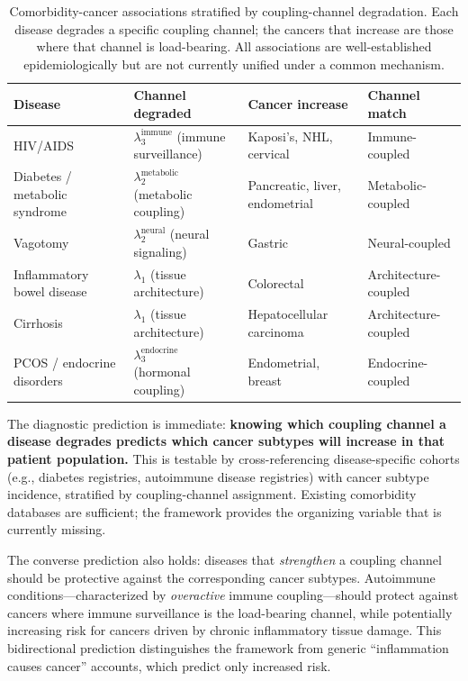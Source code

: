 \documentclass[11pt]{article}
\theoremstyle{definition}
\theoremstyle{remark}
\begin{document}
\begin{table}[ht]
\centering
\small
\caption{Comorbidity-cancer associations stratified by
coupling-channel degradation. Each disease degrades a specific
coupling channel; the cancers that increase are those where that
channel is load-bearing. All associations are well-established
epidemiologically but are not currently unified under a common
mechanism.}
\label{tab:comorbidity}
\begin{tabular}{@{}p{3.0cm}p{3.0cm}p{3.5cm}p{3.0cm}@{}}
\toprule
\textbf{Disease} & \textbf{Channel degraded} &
\textbf{Cancer increase} & \textbf{Channel match} \\
\midrule
HIV/AIDS &
$\lambda_3^{\mathrm{immune}}$ (immune surveillance) &
Kaposi's, NHL, cervical &
Immune-coupled \\[4pt]
Diabetes / metabolic syndrome &
$\lambda_2^{\mathrm{metabolic}}$ (metabolic coupling) &
Pancreatic, liver, endometrial &
Metabolic-coupled \\[4pt]
Vagotomy &
$\lambda_2^{\mathrm{neural}}$ (neural signaling) &
Gastric &
Neural-coupled \\[4pt]
Inflammatory bowel disease &
$\lambda_1$ (tissue architecture) &
Colorectal &
Architecture-coupled \\[4pt]
Cirrhosis &
$\lambda_1$ (tissue architecture) &
Hepatocellular carcinoma &
Architecture-coupled \\[4pt]
PCOS / endocrine disorders &
$\lambda_3^{\mathrm{endocrine}}$ (hormonal coupling) &
Endometrial, breast &
Endocrine-coupled \\
\bottomrule
\end{tabular}
\end{table}

The diagnostic prediction is immediate: \textbf{knowing which
coupling channel a disease degrades predicts which cancer subtypes
will increase in that patient population.} This is testable by
cross-referencing disease-specific cohorts (e.g., diabetes registries,
autoimmune disease registries) with cancer subtype incidence, stratified
by coupling-channel assignment. Existing comorbidity databases are
sufficient; the framework provides the organizing variable that is
currently missing.

The converse prediction also holds: diseases that \emph{strengthen}
a coupling channel should be protective against the corresponding
cancer subtypes. Autoimmune conditions---characterized by
\emph{overactive} immune coupling---should protect against cancers
where immune surveillance is the load-bearing channel, while
potentially increasing risk for cancers driven by chronic
inflammatory tissue damage. This bidirectional prediction
distinguishes the framework from generic ``inflammation causes
cancer'' accounts, which predict only increased risk.
\end{document}
